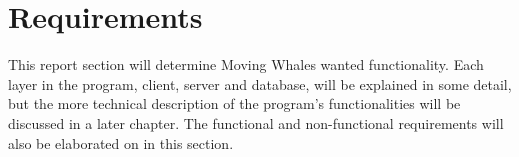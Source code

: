 \section{Requirements}

This report section will determine Moving Whales wanted functionality. Each layer in the program, client, server and database, will be explained in some detail, but the more technical description of the program's functionalities will be discussed in a later chapter. The functional and non-functional requirements will also be elaborated on in this section.



